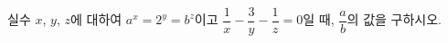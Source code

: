 실수 $x$, $y$, $z$에 대하여 $a^x=2^y=b^z$이고 $\dfrac{1}{x}-\dfrac{3}{y}-\dfrac{1}{z}=0$일 때, $\dfrac{a}{b}$의 값을 구하시오. 
